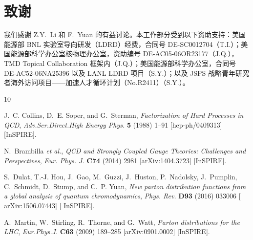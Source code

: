 \section*{致谢}

我们感谢 Z.Y.~Li 和 F.~Yuan 的有益讨论。本工作部分受到以下资助支持：美国能源部 BNL 实验室导向研发（LDRD）经费，合同号 DE-SC0012704（T.I.）；美国能源部科学办公室核物理办公室，资助编号 DE-AC05-06OR23177（J.Q.），TMD Topical Collaboration 框架内（J.Q.）；美国能源部科学办公室，合同号 DE-AC52-06NA25396 以及 LANL LDRD 项目（S.Y.）；以及 JSPS 战略青年研究者海外访问项目——加速人才循环计划（No.R2411）（S.Y.）。

\providecommand{\href}[2]{#2}\begingroup\raggedright\begin{thebibliography}{10}

J.~C. Collins, D.~E. Soper, and G.~Sterman, {\it {Factorization of Hard
  Processes in QCD}},
{\em Adv.Ser.Direct.High Energy Phys.} {\bfseries 5} (1988) 1--91
  [\href{http://arxiv.org/abs/hep-ph/0409313}{{\ttfamily hep-ph/0409313}}]
  [\href{http://inspirehep.net/record/25808}{{\ttfamily InSPIRE}}].

N.~Brambilla {\em et al.}, {\it {QCD and Strongly Coupled Gauge Theories:
  Challenges and Perspectives}},
\href{http://dx.doi.org/10.1140/epjc/s10052-014-2981-5}{{\em Eur. Phys. J.}
  {\bfseries C74} (2014) 2981}
  [\href{http://arxiv.org/abs/1404.3723}{{\ttfamily arXiv:1404.3723}}]
  [\href{http://inspirehep.net/record/1290484}{{\ttfamily InSPIRE}}].

S.~Dulat, T.-J. Hou, J.~Gao, M.~Guzzi, J.~Huston, P.~Nadolsky, J.~Pumplin,
  C.~Schmidt, D.~Stump, and C.~P. Yuan, {\it {New parton distribution functions
  from a global analysis of quantum chromodynamics}},
\href{http://dx.doi.org/10.1103/PhysRevD.93.033006}{{\em Phys. Rev.} {\bfseries
  D93} (2016) 033006} [\href{http://arxiv.org/abs/1506.07443}{{\ttfamily
  arXiv:1506.07443}}] [\href{http://inspirehep.net/record/1377752}{{\ttfamily
  InSPIRE}}].

A.~Martin, W.~Stirling, R.~Thorne, and G.~Watt, {\it {Parton distributions for
  the LHC}},
\href{http://dx.doi.org/10.1140/epjc/s10052-009-1072-5}{{\em Eur.Phys.J.}
  {\bfseries C63} (2009) 189--285}
  [\href{http://arxiv.org/abs/0901.0002}{{\ttfamily arXiv:0901.0002}}]
  [\href{http://inspirehep.net/record/810127}{{\ttfamily InSPIRE}}].


\end{thebibliography}
